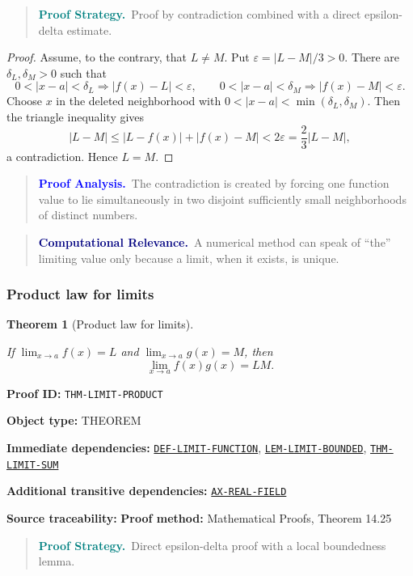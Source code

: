 \documentclass[10pt]{article}
\newcommand{\pidraw}[1]{\begingroup\urlstyle{tt}\nolinkurl{#1}\endgroup}
\newcommand{\pidref}[1]{\hyperref[prf:#1]{\pidraw{#1}}}
\newtheorem{theorem}{Theorem}[section]
\theoremstyle{definition}
\theoremstyle{remark}
\newenvironment{proofstrategy}
{\begin{quote}\small\noindent\textbf{\textcolor{teal}{Proof Strategy.}}\ }
{\end{quote}}
\newenvironment{proofanalysis}
{\begin{quote}\small\noindent\textbf{\textcolor{blue}{Proof Analysis.}}\ }
{\end{quote}}
\newenvironment{computationalrelevance}
{\begin{quote}\small\noindent\textbf{\textcolor{navy}{Computational Relevance.}}\ }
{\end{quote}}
\newcommand{\meta}[2]{\noindent\textbf{#1:} #2\par}
\begin{document}
\begin{proofstrategy}Proof by contradiction combined with a direct epsilon-delta estimate.\end{proofstrategy}

\begin{proof}

Assume, to the contrary, that $L\ne M$. Put $\varepsilon=|L-M|/3>0$.
There are $\delta_L,\delta_M>0$ such that
\[
0<|x-a|<\delta_L\Rightarrow |f(x)-L|<\varepsilon,
\qquad
0<|x-a|<\delta_M\Rightarrow |f(x)-M|<\varepsilon.
\]
Choose $x$ in the deleted neighborhood with
$0<|x-a|<\min(\delta_L,\delta_M)$. Then the triangle inequality gives
\[
|L-M|\le |L-f(x)|+|f(x)-M|<2\varepsilon=\frac23|L-M|,
\]
a contradiction. Hence $L=M$.

\end{proof}

\begin{proofanalysis}The contradiction is created by forcing one function value to lie simultaneously in two disjoint sufficiently small neighborhoods of distinct numbers.\end{proofanalysis}

\begin{computationalrelevance}A numerical method can speak of ``the'' limiting value only because a limit, when it exists, is unique.\end{computationalrelevance}

\subsubsection{Product law for limits}

\begin{theorem}[Product law for limits]\label{prf:THM-LIMIT-PRODUCT}

If $\lim_{x\to a}f(x)=L$ and $\lim_{x\to a}g(x)=M$, then
\[
\lim_{x\to a}f(x)g(x)=LM.
\]

\end{theorem}

\meta{Proof ID}{\pidraw{THM-LIMIT-PRODUCT}}
\meta{Object type}{THEOREM}
\meta{Immediate dependencies}{\pidref{DEF-LIMIT-FUNCTION}, \pidref{LEM-LIMIT-BOUNDED}, \pidref{THM-LIMIT-SUM}}
\meta{Additional transitive dependencies}{\pidref{AX-REAL-FIELD}}
\meta{Source traceability}{\textbf{Proof method:} Mathematical Proofs, Theorem 14.25}

\begin{proofstrategy}Direct epsilon-delta proof with a local boundedness lemma.\end{proofstrategy}
\end{document}
